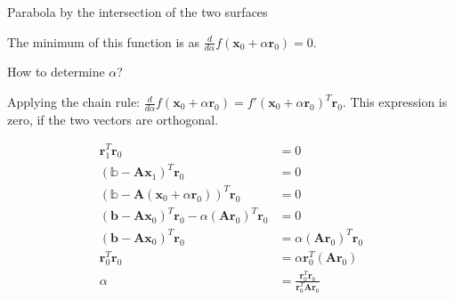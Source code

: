 \documentclass[12pt,t]{beamer}
\begin{document}
\begin{frame}[fragile]{Parabola by the intersection of the two surfaces }

\begin{center}
\end{center}
The minimum of this function is as $\frac{d}{d\alpha} f(\mathbf{x}_0 + \alpha \mathbf{r}_0) = 0$. 

\end{frame}

\begin{frame}{How to determine $\alpha$?}

Applying the chain rule: $\frac{d}{d\alpha} f(\mathbf{x}_0 + \alpha \mathbf{r}_0)= f'(\mathbf{x}_0 + \alpha \mathbf{r}_0)^T \mathbf{r}_0$. This expression is zero, if the two vectors are orthogonal. 

\begin{align*}
\mathbf{r}^T_1 \mathbf{r}_0 &= 0 \\
(\mathbb{b}-\mathbf{A} \mathbf{x}_1)^T \mathbf{r}_0 & = 0 \\
(\mathbb{b}-\mathbf{A} (\mathbf{x}_0 + \alpha \mathbf{r}_0))^T \mathbf{r}_0 & = 0 \\
(\mathbf{b}- \mathbf{A} \mathbf{x}_0)^T \mathbf{r}_0 - \alpha(\mathbf{A}\mathbf{r}_0)^T \mathbf{r}_0 &= 0 \\
(\mathbf{b}- \mathbf{A} \mathbf{x}_0)^T \mathbf{r}_0  &= \alpha(\mathbf{A}\mathbf{r}_0)^T \mathbf{r}_0 \\
\mathbf{r}^T_0 \mathbf{r}_0 &= \alpha \mathbf{r}^T_0 (\mathbf{A}\mathbf{r}_0) \\
\alpha &= \frac{\mathbf{r}^T_0 \mathbf{r}_0}{\mathbf{r}^T_0 \mathbf{A}\mathbf{r}_0}
\end{align*}

\end{frame}
\end{document}
